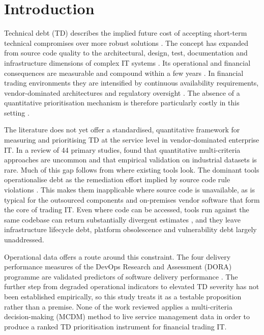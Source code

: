 \documentclass[
  authoryear,
  preprint]{elsarticle}
\begin{document}
\section{Introduction}\label{sec-intro}

Technical debt (TD) describes the implied future cost of accepting
short-term technical compromises over more robust solutions
\citep{cunninghamWyCashPortfolioManagement1992}. The concept has
expanded from source code quality to the architectural, design, test,
documentation and infrastructure dimensions of complex IT systems
\citep{kruchtenTechnicalDebtMetaphor2012}. Its operational and financial
consequences are measurable and compound within a few years
\citep{bankerTechnicalDebtFirm2020}. In financial trading environments
they are intensified by continuous availability requirements,
vendor-dominated architectures and regulatory oversight
\citep{finmaCircular202312024}. The absence of a quantitative
prioritisation mechanism is therefore particularly costly in this
setting
\citep{hakiDigitalNudgingTechnical2023, ramasubbuControllingTechnicalDebt2021}.

The literature does not yet offer a standardised, quantitative framework
for measuring and prioritising TD at the service level in
vendor-dominated enterprise IT. In a review of 44 primary studies,
\citet{lenarduzziSystematicLiteratureReview2021} found that quantitative
multi-criteria approaches are uncommon and that empirical validation on
industrial datasets is rare. Much of this gap follows from where
existing tools look. The dominant tools operationalise debt as the
remediation effort implied by source code rule violations
\citep{biazottoTechnicalDebtManagement2024}. This makes them
inapplicable where source code is unavailable, as is typical for the
outsourced components and on-premises vendor software that form the core
of trading IT. Even where code can be accessed, tools run against the
same codebase can return substantially divergent estimates
\citep{amanatidisEvaluatingAgreementTechnical2020}, and they leave
infrastructure lifecycle debt, platform obsolescence and vulnerability
debt largely unaddressed.

Operational data offers a route around this constraint. The four
delivery performance measures of the DevOps Research and Assessment
(DORA) programme are validated predictors of software delivery
performance \citep{forsgrenAccelerate2018}. The further step from
degraded operational indicators to elevated TD severity has not been
established empirically, so this study treats it as a testable
proposition rather than a premise. None of the work reviewed applies a
multi-criteria decision-making (MCDM) method to live service management
data in order to produce a ranked TD prioritisation instrument for
financial trading IT.
\end{document}
